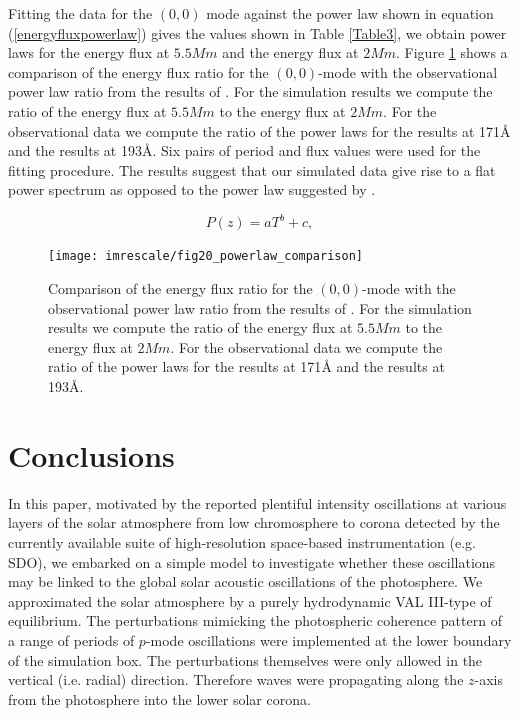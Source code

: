 \documentclass[preprint,authoryear,12pt]{elsarticle}
\begin{document}
Fitting  the  data for the $(0, 0)$ mode against the power law shown in equation (\ref{energyfluxpowerlaw}) gives the values shown in Table \ref{Table3}, we obtain power laws for the energy flux at $5.5Mm$ and the energy flux at $2Mm$. Figure \ref{Fig20} shows a comparison of the energy flux ratio for the $(0,0)$-mode with the observational power law ratio from the results of  \citet{Ireland2015}. For the simulation results we compute the ratio of the energy flux at $5.5Mm$ to the energy flux at $2Mm$. For the observational data we compute the ratio of the power laws for the results at 171{\AA} and the results at 193{\AA}. Six pairs of period and flux values were used for the fitting procedure. The results suggest that our simulated data give rise to a flat power spectrum as opposed to the power law suggested by \citet{Ireland2015}.






\begin{equation}
P(z)= aT^{b}+c,
\label{energyfluxpowerlaw}
\end{equation}

\begin{figure}[t]
\texttt{[image: imrescale/fig20\_powerlaw\_comparison]}
\caption{Comparison of the energy flux ratio for the $(0,0)$-mode with the observational power law ratio from the results of  \citet{Ireland2015}. For the simulation results we compute the ratio of the energy flux at $5.5Mm$ to the energy flux at $2Mm$. For the observational data we compute the ratio of the power laws for the results at 171{\AA} and the results at 193{\AA}.}
\label{Fig20}
\end{figure}




\section{Conclusions}

In this paper, motivated by the reported plentiful intensity oscillations at various layers of the solar atmosphere from low chromosphere to corona detected by the currently available suite of high-resolution space-based instrumentation (e.g. SDO), we embarked on a simple model to investigate whether these oscillations may be linked to the global solar acoustic oscillations of the photosphere. We approximated the solar atmosphere by a purely hydrodynamic VAL III-type of equilibrium. The perturbations mimicking the photospheric coherence pattern of a range of periods of $p$-mode oscillations were implemented at the lower boundary of the simulation box. The perturbations themselves were only allowed in the vertical (i.e. radial) direction. Therefore waves were propagating along the $z$-axis from the photosphere into the lower solar corona. 
\end{document}

